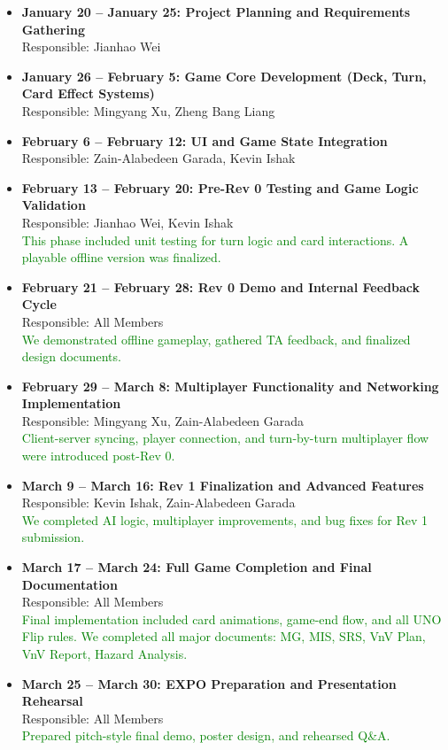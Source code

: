 \documentclass[12pt, titlepage]{article}
\newcommand{\added}[1]{\textcolor{green}{#1}}
\begin{document}
\begin{itemize}
    \item \textbf{January 20 – January 25: Project Planning and Requirements Gathering} \\
    Responsible: Jianhao Wei

    \item \textbf{January 26 – February 5: Game Core Development (Deck, Turn, Card Effect Systems)} \\
    Responsible: Mingyang Xu, Zheng Bang Liang

    \item \textbf{February 6 – February 12: UI and Game State Integration} \\
    Responsible: Zain-Alabedeen Garada, Kevin Ishak

    \item \textbf{February 13 – February 20: Pre-Rev 0 Testing and Game Logic Validation} \\
    Responsible: Jianhao Wei, Kevin Ishak \\
    \added{This phase included unit testing for turn logic and card interactions. A playable offline version was finalized.}

    \item \textbf{February 21 – February 28: Rev 0 Demo and Internal Feedback Cycle} \\
    Responsible: All Members \\
    \added{We demonstrated offline gameplay, gathered TA feedback, and finalized design documents.}

    \item \textbf{February 29 – March 8: Multiplayer Functionality and Networking Implementation} \\
    Responsible: Mingyang Xu, Zain-Alabedeen Garada \\
    \added{Client-server syncing, player connection, and turn-by-turn multiplayer flow were introduced post-Rev 0.}

    \item \textbf{March 9 – March 16: Rev 1 Finalization and Advanced Features} \\
    Responsible: Kevin Ishak, Zain-Alabedeen Garada \\
    \added{We completed AI logic, multiplayer improvements, and bug fixes for Rev 1 submission.}

    \item \textbf{March 17 – March 24: Full Game Completion and Final Documentation} \\
    Responsible: All Members \\
    \added{Final implementation included card animations, game-end flow, and all UNO Flip rules. We completed all major documents: MG, MIS, SRS, VnV Plan, VnV Report, Hazard Analysis.}

    \item \textbf{March 25 – March 30: EXPO Preparation and Presentation Rehearsal} \\
    Responsible: All Members \\
    \added{Prepared pitch-style final demo, poster design, and rehearsed Q\&A.}
\end{itemize}
\end{document}

